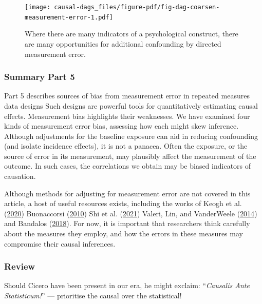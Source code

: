 \documentclass[
  singlecolumn]{article}
\begin{document}
\begin{figure}

{\centering \texttt{[image: causal-dags\_files/figure-pdf/fig-dag-coarsen-measurement-error-1.pdf]}

}

\caption{\label{fig-dag-coarsen-measurement-error}Where there are many
indicators of a psychological construct, there are many opportunities
for additional confounding by directed measurement error.}

\end{figure}

\hypertarget{summary-part-5}{%
\subsubsection{Summary Part 5}\label{summary-part-5}}

Part 5 describes sources of bias from measurement error in repeated
measures data designs Such designs are powerful tools for quantitatively
estimating causal effects. Measurement bias highlights their weaknesses.
We have examined four kinds of measurement error bias, assessing how
each might skew inference. Although adjustments for the baseline
exposure can aid in reducing confounding (and isolate incidence
effects), it is not a panacea. Often the exposure, or the source of
error in its measurement, may plausibly affect the measurement of the
outcome. In such cases, the correlations we obtain may be biased
indicators of causation.

Although methods for adjusting for measurement error are not covered in
this article, a host of useful resources exists, including the works of
Keogh et al. (\protect\hyperlink{ref-keogh2020}{2020}) Buonaccorsi
(\protect\hyperlink{ref-buonaccorsi2010}{2010}) Shi et al.
(\protect\hyperlink{ref-shi2021}{2021}) Valeri, Lin, and VanderWeele
(\protect\hyperlink{ref-valeri2014}{2014}) and Bandalos
(\protect\hyperlink{ref-bandalos2018}{2018}). For now, it is important
that researchers think carefully about the measures they employ, and how
the errors in these measures may compromise their causal inferences.

\hypertarget{review}{%
\subsubsection{Review}\label{review}}

Should Cicero have been present in our era, he might exclaim:
``\emph{Causalis Ante Statisticum!}'' --- prioritise the causal over the
statistical!
\end{document}
